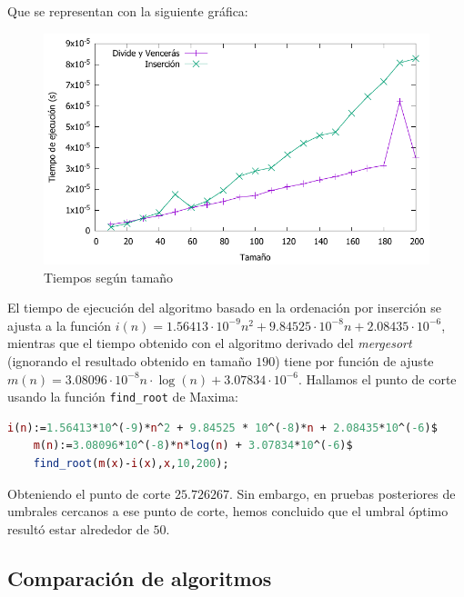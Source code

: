 \pgfplotstabletypeset[
display columns/0/.style={column name=Tamaño},
display columns/1/.style={column name=Inserción},
display columns/2/.style={column name=Mergesort},
]{\prefIns}

\vspace*{1cm}

Que se representan con la siguiente gráfica:

\begin{figure}[H]\includegraphics[width=14cm]{img/umbral_preferencias.pdf} \centering
	\caption{Tiempos según tamaño}
\end{figure}

El tiempo de ejecución del algoritmo basado en la ordenación por inserción se ajusta a la función $i(n) = 1.56413 \cdot 10^{-9} n^2 + 9.84525 \cdot 10^{-8} n + 2.08435 \cdot 10^{-6}$, mientras que el tiempo obtenido con el algoritmo derivado del \textit{mergesort} (ignorando el resultado obtenido en tamaño $190$) tiene por función de ajuste $m(n) = 3.08096 \cdot 10^{-8} n \cdot \log(n) + 3.07834 \cdot 10^{-6}$. Hallamos el punto de corte usando la función \texttt{find\_root} de Maxima:

\begin{lstlisting}[language=Maxima]
	i(n):=1.56413*10^(-9)*n^2 + 9.84525 * 10^(-8)*n + 2.08435*10^(-6)$
	m(n):=3.08096*10^(-8)*n*log(n) + 3.07834*10^(-6)$
	find_root(m(x)-i(x),x,10,200);
\end{lstlisting}

Obteniendo el punto de corte $25.726267$. Sin embargo, en pruebas posteriores de umbrales cercanos a ese punto de corte, hemos concluido que el umbral óptimo resultó estar alrededor de $50$.

\subsection{Comparación de algoritmos}

